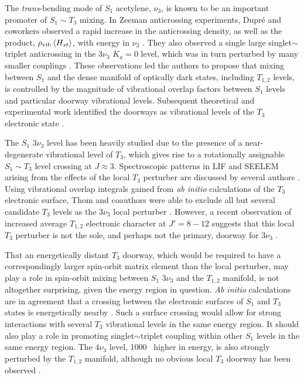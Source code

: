 The \emph{trans}-bending mode of $S_1$ acetylene, $\nu_3$, is known to
be an important promoter of $S_1 \sim T_3$ mixing.  In Zeeman
anticrossing experiments, Dupr\'{e} and coworkers observed a rapid
increase in the anticrossing density, as well as the product,
$\rho_{\text{vib}} \mathinner{\langle{H_{st}}\rangle}$, with energy in $\nu_3$
\cite{dupre91, dupre95b}.  They also observed a single large
singlet$\sim$triplet anticrossing in the $3 \nu_3$ $K_a=0$ level,
which was in turn perturbed by many smaller couplings \cite{dupre93}.
These observations led the authors to propose that mixing between
$S_1$ and the dense manifold of optically dark states, including
$T_{1,2}$ levels, is controlled by the magnitude of vibrational
overlap factors between $S_1$ levels and particular doorway
vibrational levels.  Subsequent theoretical and experimental work
identified the doorways as vibrational levels of the $T_3$ electronic
state \cite{vacek96, sherrill96, humphrey97, altunata00}.

The $S_1$ $3 \nu_3$  level has been heavily studied due to the
presence of a near-degenerate vibrational level of $T_3$, which gives
rise to a rotationally assignable $S_1 \sim T_3$ level crossing at $J
\approx 3$.  Spectroscopic patterns in LIF and SEELEM arising from the
effects of the local $T_3$ perturber are discussed by several authors
\cite{humphrey97, altunata00, altunata01, mishra04}.  Using
vibrational overlap integrals gained from \emph{ab initio}
calculations of the $T_3$ electronic surface, Thom and coauthors were
able to exclude all but several candidate $T_3$ levels as the $3\nu_3$
local perturber \cite{thom07}.
However, a recent observation of increased average $T_{1,2}$
electronic character at $J'=8-12$ suggests that this local $T_3$
perturber is not the sole, and perhaps not the primary, doorway for $3
\nu_3$  \cite{degroot07}.

That an energetically distant $T_3$ doorway, which would be required
to have a correspondingly larger spin-orbit matrix element than the
local perturber, may play a role in spin-orbit mixing between $S_1$ $3
\nu_3$ and the $T_{1,2}$ manifold, is not altogether surprising, given
the energy region in question.  \emph{Ab initio} calculations are in
agreement that a crossing between the electronic surfaces of $S_1$ and
$T_3$ states is energetically nearby \cite{ventura03, thom07}.  Such a
surface crossing would allow for strong interactions with several
$T_3$ vibrational levels in the same energy region.  It should also
play a role in promoting singlet$\sim$triplet coupling within other
$S_1$ levels in the same energy region.  The $4\nu_3$ level, 1000
\rcm\ higher in energy, is also strongly perturbed by the $T_{1,2}$
manifold, although no obvious local $T_3$ doorway has been observed
\cite{drabbels94, ochi91}.

